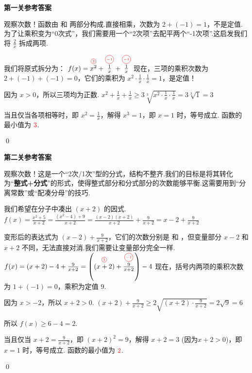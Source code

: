 \begin{solution}
	\textbf{第一关参考答案}
	
	\textcolor{green!50!black}{观察次数！函数由  和  两部分构成.直接相乘，次数为 $2+(-1)=1$，不是定值.为了让乘积变为“0次式”，我们需要用一个“2次项”去配平两个“-1次项”.这启发我们将 $\frac{2}{x}$ 拆成两项.}
	
		我们将原式拆分为：
		$f(x) = \degree{2}{x^2} + \degree{-1}{\frac{1}{x}} + \degree{-1}{\frac{1}{x}}$
		现在，三项的乘积次数为 $2+(-1)+(-1)=0$，它们的乘积为 $x^2 \cdot \frac{1}{x} \cdot \frac{1}{x} = 1$，是定值！
		
		因为 $x>0$，所以三项均为正数.
		$x^2 + \frac{1}{x} + \frac{1}{x} \ge 3\sqrt[3]{x^2 \cdot \frac{1}{x} \cdot \frac{1}{x}} = 3\sqrt[3]{1} = 3$

		当且仅当各项相等时，即 $x^2 = \frac{1}{x}$，解得 $x^3=1$，即 $x=1$ 时，等号成立.
	函数的最小值为 $\textcolor{red}{3}$.
\end{solution}
\qed
\begin{solution}
	\textbf{第二关参考答案}
	
	\textcolor{green!50!black}{观察次数！这是一个“2次/1次”型的分式，结构不整齐.我们的目标是将其转化为“\textbf{整式+分式}”的形式，使得整式部分和分式部分的次数能够平衡.这需要用到“分离常数”或“配凑分母”的技巧.}
	
		我们希望在分子中凑出 $(x+2)$ 的因式.
		$f(x) = \frac{x^2+5}{x+2} = \frac{(x^2-4)+9}{x+2} = \frac{(x-2)(x+2)}{x+2} + \frac{9}{x+2} = x-2+\frac{9}{x+2}$

		变形后的表达式为 $(x-2)+\frac{9}{x+2}$，它们的次数分别是  和 ，但变量部分 $x-2$ 和 $x+2$ 不同，无法直接对消.我们需要让变量部分完全一样.
		$f(x) = (x+2) - 4 + \frac{9}{x+2} = \left( \degree{1}{(x+2)} + \degree{-1}{\frac{9}{x+2}} \right) - 4$
		现在，括号内两项的乘积次数为 $1+(-1)=0$，乘积为定值 $9$.
		
		因为 $x>-2$，所以 $x+2>0$.
		$(x+2) + \frac{9}{x+2} \ge 2\sqrt{(x+2) \cdot \frac{9}{x+2}} = 2\sqrt{9} = 6$
		
		所以 $f(x) \ge 6-4=2$.
		
		当且仅当 $x+2 = \frac{9}{x+2}$，即 $(x+2)^2=9$，解得 $x+2=3$ (因为$x+2>0$)，即 $x=1$ 时，等号成立.
	函数的最小值为 $\textcolor{red}{2}$.
\end{solution}
\qed
